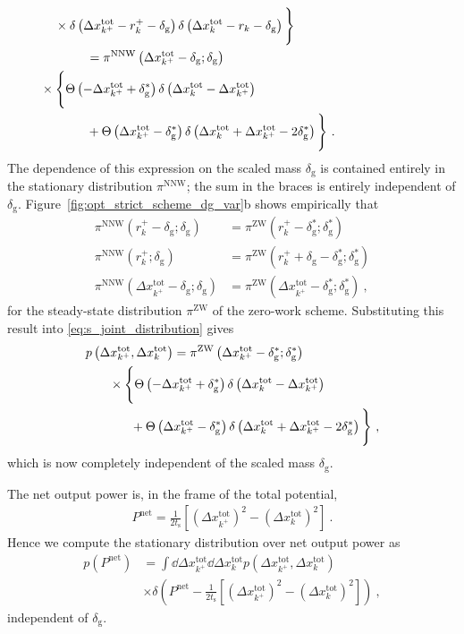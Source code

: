 \documentclass[%
reprint,
bibnotes, amsmath, amssymb, aps, pre,
 showkeys,
floatfix
]{revtex4-2}
\newcommand{\mrm}{\mathrm}
\newcommand{\pr}[1]{\left(#1\right)} %
\newcommand{\sr}[1]{\left[#1\right]} %
\newcommand{\dg}{\delta_{\mrm{g}}}
\newcommand{\ts}{t_{\mrm{s}}}
\newcommand{\xkpr}{r_{k}^{+}}
\newcommand{\xkrt}{\Delta x_{k}^{\mrm{tot}}}
\newcommand{\xkprt}{\Delta x_{k^{+}}^{\mrm{tot}}}
\newcommand{\pn}{P^{\mrm{net}}}
\begin{document}
{\begin{subequations}
\begin{align}
        &\hspace{-2.1cm}\times\delta\pr{\xkprt-r_{k}^{+}-\dg}\delta\pr{\xkrt-r_{k}-\dg}\Bigg\}\\
        &\hspace{-1.2cm}=\pi^{\mrm{NNW}}\pr{\xkprt-\dg; \dg}\nonumber\\
        &\hspace{-2.5cm}\times\Bigg\{\Theta\pr{-\xkprt+\dg^{*}}\delta\pr{\xkrt-\xkprt}\\
        &\hspace{-1.2cm}+\Theta\pr{\xkprt-\dg^{*}}\delta\pr{\xkrt + \xkprt-2\dg^{*}}\Bigg\}\nonumber\ .
    \end{align}
\end{subequations}
The dependence of this expression on the scaled mass $\dg$ is contained entirely in the stationary distribution $\pi^{\mrm{NNW}}$; the sum in the braces is entirely independent of $\dg$. 
Figure~\ref{fig:opt_strict_scheme_dg_var}b shows empirically that
\begin{subequations}
    \begin{align}
        \pi^{\mrm{NNW}}\pr{\xkpr - \dg; \dg} &= \pi^{\mrm{ZW}}\pr{\xkpr - \dg^{*}; \dg^{*}}\label{eq:distr_equality}\\
        \pi^{\mrm{NNW}}\pr{\xkpr; \dg} &= \pi^{\mrm{ZW}}\pr{\xkpr + \dg - \dg^{*}; \dg^{*}}\\
        \pi^{\mrm{NNW}}\pr{\xkprt-\dg; \dg} &= \pi^{\mrm{ZW}}\pr{\xkprt - \dg^{*}; \dg^{*}}\ ,
    \end{align}
\end{subequations}
for the steady-state distribution $\pi^{\mrm{ZW}}$ of the zero-work scheme.
Substituting this result into \eqref{eq:s_joint_distribution} gives
\begin{align}
    p\pr{\xkprt,\xkrt} &= \pi^{\mrm{ZW}}\pr{\xkprt-\dg^{*}; \dg^{*}}\nonumber\\
        &\hspace{-1.8cm}\times\Bigg\{\Theta\pr{-\xkprt+\dg^{*}}\delta\pr{\xkrt-\xkprt}\\
        &\hspace{-1.2cm}+\Theta\pr{\xkprt-\dg^{*}}\delta\pr{\xkrt + \xkprt-2\dg^{*}}\Bigg\}\nonumber\ ,\label{eq:s_joint_distribution_indep}
\end{align}
which is now completely independent of the scaled mass $\dg$.

The net output power is, in the frame of the total potential, 
\begin{align}
    \pn = \frac{1}{2\ts}\sr{\pr{\xkprt}^{2} - \pr{\xkrt}^{2}}\ .
\end{align}
Hence we compute the stationary distribution over net output power as
\begin{align}
    p\pr{\pn} &= \int\dd{\xkprt}\dd{\xkrt}p\pr{\xkprt, \xkrt}\\
    &\times\delta\pr{\pn - \frac{1}{2\ts}\sr{\pr{\xkprt}^{2} - \pr{\xkrt}^{2}}}\ ,\nonumber
\end{align}
independent of $\dg$.

}
\end{document}
